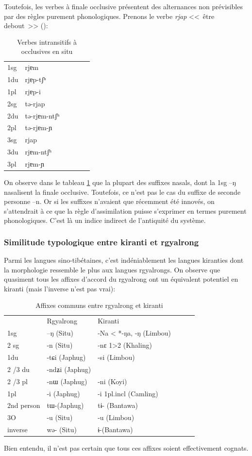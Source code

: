\documentclass[oldfontcommands,oneside,a4paper,11pt]{memoir}
\begin{document}
Toutefois, les verbes à finale occlusive présentent des alternances non prévisibles par des règles purement phonologiques. Prenons le verbe \textit{rjap} <<~être debout~>> (\citealt[207]{linxr93jiarong}):
\begin{table}[H]
\caption{Verbes intransitifs à occlusives en situ }\label{tab:situ2}
\begin{tabular}{llllll} 
1sg &	rjɐm  \\
1du &	rjɐp-tʃʰ \\
1pl &	rjɐp-i \\
2sg &	tə-rjap \\
2du &	tə-rjɐm-ntʃʰ \\
2pl &	tə-rjɐm-ɲ \\
3sg &	rjap \\
3du &	rjɐm-ntʃʰ \\
3pl &	rjɐm-ɲ \\
\end{tabular}
\end{table}
On observe dans le tableau \ref{tab:situ2} que la plupart des suffixes nasals, dont la 1sg --ŋ nasalisent la finale occlusive. Toutefois, ce n'est pas le cas du suffixe de seconde personne --n. Or si les suffixes n'avaient que récemment été innovés, on s'attendrait à ce que la règle d'assimilation puisse s'exprimer en termes purement phonologiques. C'est là un indice indirect de l'antiquité du système.
\subsubsection{Similitude typologique entre kiranti et rgyalrong}

Parmi les langues sino-tibétaines, c'est indéniablement les langues kiranties dont la morphologie ressemble le plus aux langues rgyalrongs. On observe que quasiment tous les affixes d'accord du rgyalrong ont un équivalent potentiel en kiranti (mais l'inverse n'est pas vrai):
\begin{table}[H]
\caption{Affixes communs entre rgyalrong et kiranti}\label{tab:rgyalrong.kiranti}
\begin{tabular}{llllll} 
\toprule
    &	Rgyalrong   &	Kiranti   \\	
1sg   &	–ŋ (Situ)   &	-Na < *-ŋa, -ŋ (Limbou)   \\	
2 sg   &	-n (Situ)   &	-nɛ 1>2 (Khaling)   \\	
1du   &	-tɕi (Japhug)   &	-si (Limbou)   \\	
2 /3 du   &	-ndʑi (Japhug)   &	   \\	
2 /3 pl   &	-nɯ (Japhug)   &	-ni (Koyi)   \\	
1pl   &	-i (Japhug)   &	-i 1pl.incl (Camling)   \\	
2nd person   &	tɯ-(Japhug)   &	tɨ- (Bantawa)   \\	
3O   &	-u (Situ)   &	-u (Limbou)   \\	
inverse   &	wə- (Situ)   &	ɨ-(Bantawa)   \\	
\bottomrule
\end{tabular}
\end{table}
Bien entendu, il n'est pas certain que tous ces affixes soient effectivement cognats.
\end{document}
